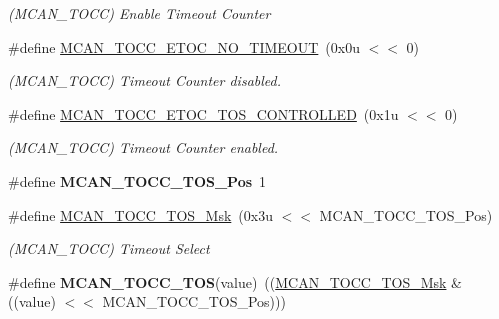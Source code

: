 \begin{DoxyCompactItemize}
\begin{DoxyCompactList}\small\item\em (M\+C\+A\+N\+\_\+\+T\+O\+CC) Enable Timeout Counter \end{DoxyCompactList}\item 
\mbox{\label{group__SAME70__MCAN_ga2e7c178e99a398ef439b1cdfbb548f80}} 
\#define \mbox{\hyperlink{group__SAME70__MCAN_ga2e7c178e99a398ef439b1cdfbb548f80}{M\+C\+A\+N\+\_\+\+T\+O\+C\+C\+\_\+\+E\+T\+O\+C\+\_\+\+N\+O\+\_\+\+T\+I\+M\+E\+O\+UT}}~(0x0u $<$$<$ 0)
\begin{DoxyCompactList}\small\item\em (M\+C\+A\+N\+\_\+\+T\+O\+CC) Timeout Counter disabled. \end{DoxyCompactList}\item 
\mbox{\label{group__SAME70__MCAN_ga4020ea57a7f6deff4f4f358069eeef01}} 
\#define \mbox{\hyperlink{group__SAME70__MCAN_ga4020ea57a7f6deff4f4f358069eeef01}{M\+C\+A\+N\+\_\+\+T\+O\+C\+C\+\_\+\+E\+T\+O\+C\+\_\+\+T\+O\+S\+\_\+\+C\+O\+N\+T\+R\+O\+L\+L\+ED}}~(0x1u $<$$<$ 0)
\begin{DoxyCompactList}\small\item\em (M\+C\+A\+N\+\_\+\+T\+O\+CC) Timeout Counter enabled. \end{DoxyCompactList}\item 
\mbox{\label{group__SAME70__MCAN_ga92d26cd7f9715c416897d0fb53640e37}} 
\#define {\bfseries M\+C\+A\+N\+\_\+\+T\+O\+C\+C\+\_\+\+T\+O\+S\+\_\+\+Pos}~1
\item 
\mbox{\label{group__SAME70__MCAN_ga41d673d6c9d24e8f12494359ebeaa22e}} 
\#define \mbox{\hyperlink{group__SAME70__MCAN_ga41d673d6c9d24e8f12494359ebeaa22e}{M\+C\+A\+N\+\_\+\+T\+O\+C\+C\+\_\+\+T\+O\+S\+\_\+\+Msk}}~(0x3u $<$$<$ M\+C\+A\+N\+\_\+\+T\+O\+C\+C\+\_\+\+T\+O\+S\+\_\+\+Pos)
\begin{DoxyCompactList}\small\item\em (M\+C\+A\+N\+\_\+\+T\+O\+CC) Timeout Select \end{DoxyCompactList}\item 
\mbox{\label{group__SAME70__MCAN_ga434daf57915e9a16f5f01e70ee2bae40}} 
\#define {\bfseries M\+C\+A\+N\+\_\+\+T\+O\+C\+C\+\_\+\+T\+OS}(value)~((\mbox{\hyperlink{group__SAMV71__MCAN_ga41d673d6c9d24e8f12494359ebeaa22e}{M\+C\+A\+N\+\_\+\+T\+O\+C\+C\+\_\+\+T\+O\+S\+\_\+\+Msk}} \& ((value) $<$$<$ M\+C\+A\+N\+\_\+\+T\+O\+C\+C\+\_\+\+T\+O\+S\+\_\+\+Pos)))

\end{DoxyCompactItemize}
